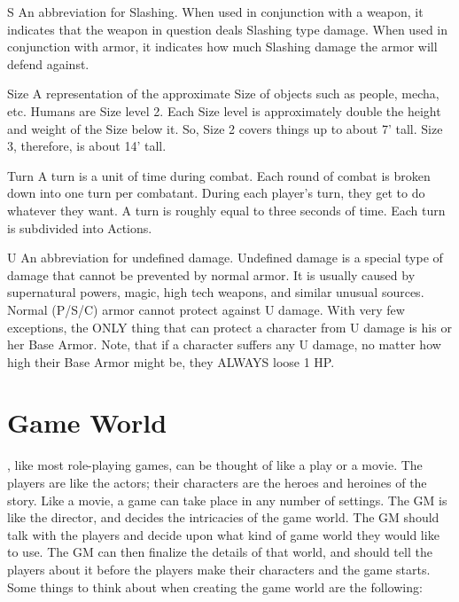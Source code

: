 \documentclass[twoside]{book}
\begin{document}
              
               S   
                  An abbreviation for Slashing. When used in
                 conjunction with a weapon, it indicates that the weapon
                 in question deals Slashing type damage. When used in
                 conjunction with armor, it indicates how much Slashing
                 damage the armor will defend against. 
              
              
               Size   
                  A representation of the approximate Size of
                 objects such as people, mecha, etc. Humans are Size
                 level 2. Each Size level is approximately double the
                 height and weight of the Size below it. So, Size 2
                 covers things up to about 7’ tall. Size 3,
                 therefore, is about 14’ tall. 
              
              
               Turn   
                  A turn is a unit of time during combat. Each
                 round of combat is broken down into one turn per
                 combatant. During each player’s turn, they get to
                 do whatever they want. A turn is roughly equal to three
                 seconds of time. Each turn is subdivided into Actions.
                 
              
              
               U   
                  An abbreviation for undefined damage. Undefined
                 damage is a special type of damage that cannot be
                 prevented by normal armor. It is usually caused by
                 supernatural powers, magic, high tech weapons, and
                 similar unusual sources. Normal (P/S/C) armor cannot
                 protect against U damage. With very few exceptions, the
                 ONLY thing that can protect a character from U damage is
                 his or her Base Armor. Note, that if a character suffers
                 any U damage, no matter how high their Base Armor might
                 be, they ALWAYS loose 1 HP. 
              
          
\section{Game World}
    \APATHY{}, like most role-playing games, can be
            thought of like a play or a movie. The players are like the
            actors; their characters are the heroes and heroines of the
            story. Like a movie, a game can take place in any number of
            settings. The GM is like the director, and decides the
            intricacies of the game world.
           The GM should talk with the players and decide upon
             what kind of game world they would like to use. The GM can
             then finalize the details of that world, and should tell the
             players about it before the players make their characters
             and the game starts.  Some things to think about when creating the game
             world are the following:   
              
\end{document}
